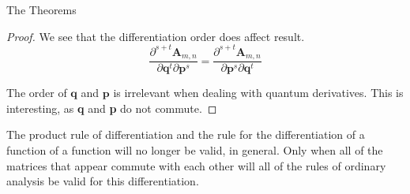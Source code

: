 \documentclass[aspectratio=169]{beamer}
\begin{document}
\begin{frame}[allowframebreaks]{The Theorems}
\begin{proof}
			We see that the differentiation order does affect result.
			\begin{equation}
				\frac{\partial^{s+t}\textbf{A}_{m,n}}{\partial\textbf{q}^t\partial\textbf{p}^s}=\frac{\partial^{s+t}\textbf{A}_{m,n}}{\partial\textbf{p}^s\partial\textbf{q}^t}
			\end{equation}
			
			The order of $\textbf{q}$ and $\textbf{p}$ is irrelevant when dealing with quantum derivatives. This is interesting, as \textbf{q} and \textbf{p} do not commute.
		\end{proof}
		
		\framebreak
		The product rule of differentiation and the rule for the differentiation of a function of a function will no longer be valid, in general. Only when all of the matrices that appear commute with each other will all of the rules of ordinary analysis be valid for this differentiation.
	\end{frame}
	
\end{document}

